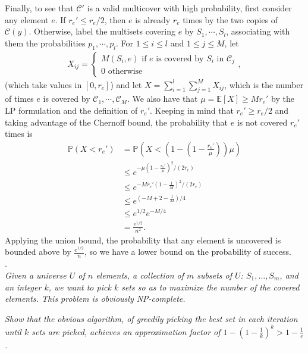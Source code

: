 \documentclass[a4paper,11pt]{article}
\begin{document}
Finally, to see that $\mathcal{C}'$ is a valid multicover with high probability, first consider any element $e$. If $r_e' \leq r_e/2$, then $e$ is already $r_e$ times by the two copies of $\mathcal{C}(y)$. Otherwise, label the multisets covering $e$ by $S_1, \cdots, S_l$, associating with them the probabilities $p_1, \cdots, p_l$. For $1 \leq i \leq l$ and $1 \leq j \leq M$, let
\begin{align*}
    X_{ij} = \begin{cases}
        M(S_i, e) \text{ if $e$ is covered by $S_i$ in $\mathcal{C}_j$} \\
        0 \text{ otherwise}
    \end{cases},
\end{align*}
(which take values in $[0, r_e]$) and let $X = \sum_{i = 1}^l \sum_{j = 1}^M X_{ij}$, which is the number of times $e$ is covered by $\mathcal{C}_1, \cdots, \mathcal{C}_M$. We also have that $\mu = \mathbb{E}[X] \geq Mr_e'$ by the LP formulation and the definition of $r_e'$. Keeping in mind that $r_e' \geq r_e/2$ and taking advantage of the Chernoff bound, the probability that $e$ is not covered $r_e'$ times is
\begin{align*}
    \mathbb{P}(X < r_e') &= \mathbb{P}(X < (1 - (1 - \frac{r_e'}{\mu}))\mu) \\
    &\leq e^{-\mu(1 - \frac{r_e'}{\mu})^2 / (2r_e)} \\
    &\leq e^{-Mr_e'(1 - \frac{1}{M})^2 / (2r_e)} \\
    &\leq e^{(-M + 2 - \frac{1}{M})/4} \\
    &\leq e^{1/2} e^{-M/4} \\
    &= \frac{e^{1/2}}{n^2}.
\end{align*}
Applying the union bound, the probability that any element is uncovered is bounded above by $\frac{e^{1/2}}{n}$, so we have a lower bound on the probability of success. \\


.\\
\emph{Given a universe $U$ of $n$ elements, a collection of $m$ subsets of $U$: $S_1 , \ldots , S_m$, 
and an integer $k$, 
we want to pick $k$ sets so as to maximize the number of the covered elements. 
This problem is obviously NP-complete.}

\emph{Show that the obvious algorithm, of greedily picking the best set in each iteration until $k$ sets are picked, 
achieves an approximation factor of $1-\left( 1- \frac{1}{k} \right)^k > 1 - \frac{1}{e}$.} \par
\end{document}
